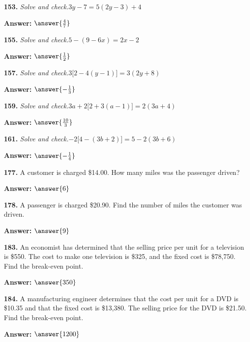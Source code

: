 \documentclass{ximera}
\begin{document}
\begin{problem}
\textbf{153.} \emph{Solve and check.}\quad $3y - 7 = 5(2y - 3) + 4$

\textbf{Answer:} $\answer{\frac{4}{7}}$
\end{problem}

\begin{problem}
\textbf{155.} \emph{Solve and check.}\quad $5 - (9 - 6x) = 2x - 2$

\textbf{Answer:} $\answer{\frac{1}{2}}$
\end{problem}

\begin{problem}
\textbf{157.} \emph{Solve and check.}\quad $3\bigl[2 - 4(y - 1)\bigr] = 3(2y + 8)$

\textbf{Answer:} $\answer{-\frac{1}{3}}$
\end{problem}

\begin{problem}
\textbf{159.} \emph{Solve and check.}\quad $3a + 2\bigl[2 + 3(a - 1)\bigr] = 2(3a + 4)$

\textbf{Answer:} $\answer{\frac{10}{3}}$
\end{problem}

\begin{problem}
\textbf{161.} \emph{Solve and check.}\quad $-2\bigl[4 - (3b + 2)\bigr] = 5 - 2(3b + 6)$

\textbf{Answer:} $\answer{-\frac{1}{4}}$
\end{problem}

\begin{problem}
\textbf{177.} A customer is charged \$14.00. How many miles was the passenger driven?

\textbf{Answer:} $\answer{6}$
\end{problem}

\begin{problem}
\textbf{178.} A passenger is charged \$20.90. Find the number of miles the customer was driven.

\textbf{Answer:} $\answer{9}$
\end{problem}

\begin{problem}
\textbf{183.} An economist has determined that the selling price per unit for a television is
  \$550. The cost to make one television is \$325, and the fixed cost is \$78,750. Find
  the break-even point.

\textbf{Answer:} $\answer{350}$
\end{problem}

\begin{problem}
\textbf{184.} A manufacturing engineer determines that the cost per unit for a DVD is \$10.35
  and that the fixed cost is \$13,380. The selling price for the DVD is \$21.50. Find
  the break-even point.

\textbf{Answer:} $\answer{1200}$
\end{problem}
\end{document}
